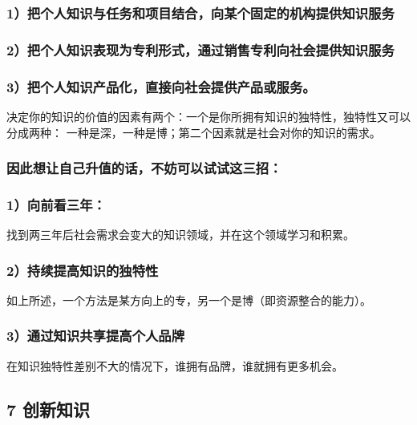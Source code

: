\documentclass[11pt]{ctexart}
\begin{document}
{{{{\subsubsection{1）把个人知识与任务和项目结合，向某个固定的机构提供知识服务}
\label{sec:orgb0e841a}

\subsubsection{2）把个人知识表现为专利形式，通过销售专利向社会提供知识服务}
\label{sec:orgea2b928}

\subsubsection{3）把个人知识产品化，直接向社会提供产品或服务。}
\label{sec:org67a952e}
决定你的知识的价值的因素有两个：一个是你所拥有知识的独特性，独特性又可以分成两种：
一种是深，一种是博；第二个因素就是社会对你的知识的需求。

\subsubsection{因此想让自己升值的话，不妨可以试试这三招：}
\label{sec:orgaab63bb}

\subsubsection{1）向前看三年：}
\label{sec:org54eb206}

找到两三年后社会需求会变大的知识领域，并在这个领域学习和积累。

\subsubsection{2）持续提高知识的独特性}
\label{sec:org50b58bc}

如上所述，一个方法是某方向上的专，另一个是博（即资源整合的能力）。

\subsubsection{3）通过知识共享提高个人品牌}
\label{sec:org7be2c28}

在知识独特性差别不大的情况下，谁拥有品牌，谁就拥有更多机会。
\subsection{7 创新知识}
\label{sec:org5998023}

}}}}
\end{document}
